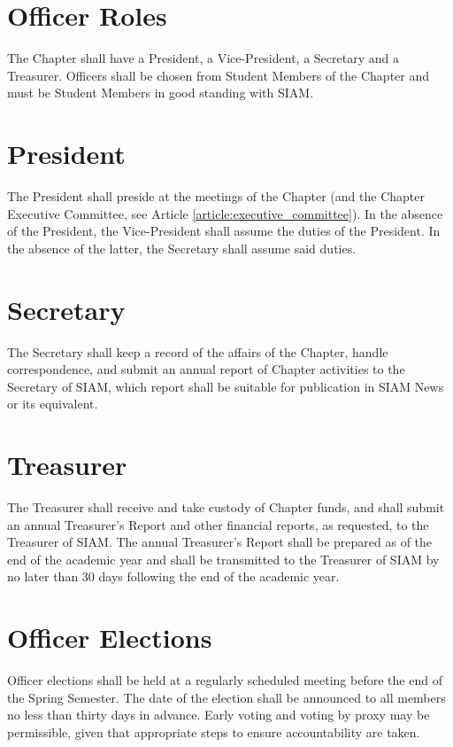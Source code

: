 \documentclass{ronr-bylaws}
\newcommand{\refarticle}[1]{Article \ref{#1}}
\begin{document}
\section{Officer Roles}\label{section:officer_roles}
The Chapter shall have a President, a Vice-President, a Secretary and a Treasurer. Officers shall be chosen from Student Members of the Chapter and must  be Student Members in good standing with SIAM.

\section{President}\label{section:president}
The President shall preside at the meetings of the Chapter (and the Chapter Executive Committee, see \refarticle{article:executive_committee}).  In the absence of the President, the Vice-President shall assume the duties of the President.  In the absence of the latter, the Secretary shall assume said duties.

\section{Secretary}\label{section:secretary}
The Secretary shall keep a record of the affairs of the Chapter, handle correspondence, and submit an annual report of Chapter activities to the Secretary of SIAM, which report shall be suitable for publication in SIAM News or its equivalent.

\section{Treasurer}\label{section:treasurer}
The Treasurer shall receive and take custody of Chapter funds, and shall submit an annual Treasurer's Report and other financial reports, as requested, to the Treasurer of SIAM.  The annual Treasurer's Report shall be prepared as of the end of the academic year and shall be transmitted to the Treasurer of SIAM by no later than 30 days following the end of the academic year.

\section{Officer Elections}\label{section:officer_elections}
Officer elections shall be held at a regularly scheduled meeting before the end of the
Spring Semester. The date of the election shall be announced to all members no less than thirty
days in advance. Early voting and voting by proxy may be permissible, given that appropriate
steps to ensure accountability are taken.
\end{document}
